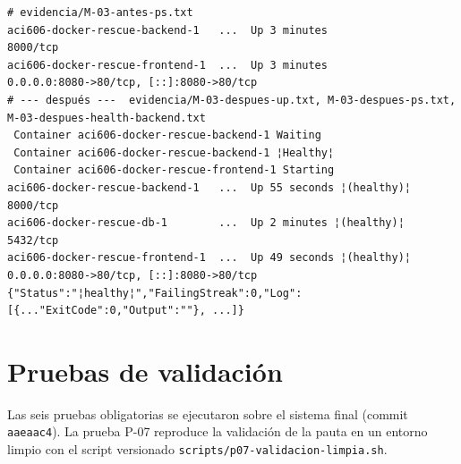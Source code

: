 \documentclass[11pt,a4paper]{article}
\newcommand{\cod}[1]{\texttt{#1}}
\begin{document}
\begin{lstlisting}
# evidencia/M-03-antes-ps.txt
aci606-docker-rescue-backend-1   ...  Up 3 minutes              8000/tcp
aci606-docker-rescue-frontend-1  ...  Up 3 minutes              0.0.0.0:8080->80/tcp, [::]:8080->80/tcp
# --- después ---  evidencia/M-03-despues-up.txt, M-03-despues-ps.txt, M-03-despues-health-backend.txt
 Container aci606-docker-rescue-backend-1 Waiting
 Container aci606-docker-rescue-backend-1 ¦Healthy¦
 Container aci606-docker-rescue-frontend-1 Starting
aci606-docker-rescue-backend-1   ...  Up 55 seconds ¦(healthy)¦   8000/tcp
aci606-docker-rescue-db-1        ...  Up 2 minutes ¦(healthy)¦    5432/tcp
aci606-docker-rescue-frontend-1  ...  Up 49 seconds ¦(healthy)¦   0.0.0.0:8080->80/tcp, [::]:8080->80/tcp
{"Status":"¦healthy¦","FailingStreak":0,"Log":[{..."ExitCode":0,"Output":""}, ...]}
\end{lstlisting}

\section{Pruebas de validación}

Las seis pruebas obligatorias se ejecutaron sobre el sistema final (commit \cod{aaeaac4}). La prueba P-07 reproduce la validación de la pauta en un entorno limpio con el script versionado \cod{scripts/p07-validacion-limpia.sh}.
\end{document}
